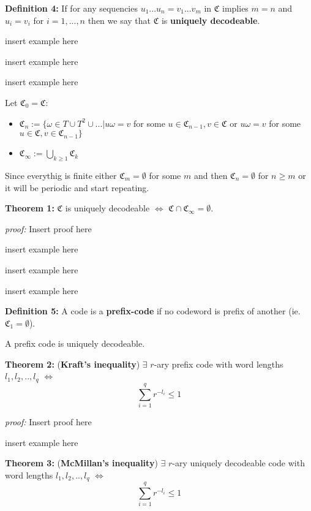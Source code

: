 \documentclass{article}
\begin{document}
\noindent\textbf{Definition 	4:}  If for any sequencies $u_1 ... u_n = v_1 ... v_m$ in $\mathfrak{C}$ implies $m = n$ and $u_i = v_i$ for $i = 1, ..., n$ then we say that $\mathfrak{C}$ is \textbf{uniquely decodeable}.

insert example here

insert example here

insert example here
 
 
\noindent Let $\mathfrak{C}_0 = \mathfrak{C}$:

\begin{itemize}
	\item $\mathfrak{C}_n := \{   \omega \in T \cup T^2 \cup... | u\omega = v$ for some $u \in \mathfrak{C}_{n-1}, v \in \mathfrak{C}$ or $ u\omega = v$ for some $u \in \mathfrak{C}, v \in \mathfrak{C}_{n-1}   \}$
	\item $\mathfrak{C}_{\infty} := \bigcup_{k \geq 1} \mathfrak{C}_k$
\end{itemize}

Since everythig is finite either $\mathfrak{C}_m = \emptyset$ for some $m$ and then $\mathfrak{C}_n = \emptyset$ for $n\geq m$ or it will be periodic and start repeating.


\noindent\textbf{Theorem 	1:} $\mathfrak{C}$ is uniquely decodeable $\Longleftrightarrow$ $\mathfrak{C} \cap \mathfrak{C}_{\infty} = \emptyset$.

 \noindent\textit{proof:}  Insert proof here

insert example here

insert example here

insert example here

\noindent\textbf{Definition 	5:}  A code is a \textbf{prefix-code} if no codeword is prefix of another (ie. $\mathfrak{C}_1 = \emptyset$).

\noindent A prefix code is uniquely decodeable.

\noindent\textbf{Theorem 	2:} (\textbf{Kraft's inequality}) $\exists$ $r$-ary prefix code with word lengths $l_1, l_2, .., l_q$ $\Longleftrightarrow$ 
$$
\sum_{i = 1}^{q} r^{-l_i} \leq 1
$$ 

 \noindent\textit{proof:}  Insert proof here

insert example here

\noindent\textbf{Theorem 	3:} (\textbf{McMillan's inequality})  $\exists$ $r$-ary uniquely decodeable code with word lengths $l_1, l_2, .., l_q$ $\Longleftrightarrow$ 
$$
\sum_{i = 1}^{q} r^{-l_i} \leq 1
$$
\end{document}
